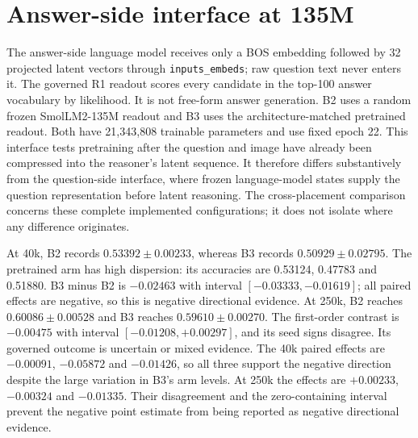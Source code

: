 \begin{table}[tbp]
\centering
\caption[Question-side frozen interfaces.]{Development accuracy on 7,714 top-100 questions over 768 represented images. All rows use seeds 0/1/2 and best-development selection. A0p is the CLIP-token reference; A1r is the architecture-matched random control for A1. SD describes training-seed variation, not a confidence interval.}
\label{tab:ch6-question-arms}
\begingroup\scriptsize\setlength{\tabcolsep}{1pt}
\renewenvironment{longtable}[1]{\begin{tabular}{|p{0.055\textwidth}|p{0.18\textwidth}|p{0.055\textwidth}|p{0.27\textwidth}|p{0.11\textwidth}|p{0.08\textwidth}|}}{\end{tabular}}
\let\endhead\relax\renewcommand{\_}{\textunderscore\allowbreak}

\endgroup
\end{table}

\section{Answer-side interface at 135M}
\label{sec:ch6-answer135}
The answer-side language model receives only a BOS embedding followed by 32
projected latent vectors through \texttt{inputs\_embeds}; raw question text
never enters it. The governed R1 readout scores every candidate in the top-100
answer vocabulary by likelihood. It is not free-form answer generation. B2
uses a random frozen SmolLM2-135M readout and B3 uses the architecture-matched
pretrained readout. Both have 21,343,808 trainable parameters and use fixed
epoch 22. This interface tests pretraining after the question and image have
already been compressed into the reasoner's latent sequence. It therefore
differs substantively from the question-side interface, where frozen
language-model states supply the question representation before latent
reasoning. The cross-placement comparison concerns these complete implemented
configurations; it does not isolate where any difference originates.

At 40k, B2 records $0.53392\pm0.00233$, whereas B3 records
$0.50929\pm0.02795$. The pretrained arm has high dispersion: its accuracies
are 0.53124, 0.47783 and 0.51880. B3 minus B2 is $-0.02463$ with interval
$[-0.03333,-0.01619]$; all paired effects are negative, so this is negative
directional evidence. At 250k, B2 reaches $0.60086\pm0.00528$ and B3 reaches
$0.59610\pm0.00270$. The first-order contrast is $-0.00475$ with interval
$[-0.01208,+0.00297]$, and its seed signs disagree. Its governed outcome is
uncertain or mixed evidence. The 40k paired effects are $-0.00091$,
$-0.05872$ and $-0.01426$, so all three support the negative direction
despite the large variation in B3's arm levels. At 250k the effects are
$+0.00233$, $-0.00324$ and $-0.01335$. Their disagreement and the
zero-containing interval prevent the negative point estimate from being
reported as negative directional evidence.

